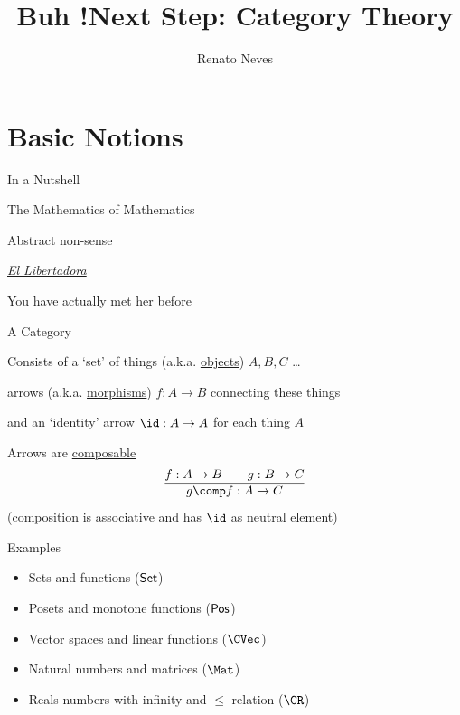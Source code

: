 \documentclass{beamer}
\author[Renato Neves]{Renato Neves}
\date{}
\begin{document}
\title{Buh !}
\frame[plain]{\titlepage}


\title{Next Step: Category Theory}

\frame[plain]{\titlepage}

\section{Basic Notions}

\begin{frame}{In a Nutshell}

        The Mathematics of Mathematics

        \bigskip
        \pause
        Abstract non-sense

        \bigskip
        \pause
        \alert{\underline{\emph{El Libertadora}}}

        \bigskip
        \pause
        You have actually met her before
\end{frame}

\begin{frame}{A Category}

        Consists of a `set' of things (a.k.a. \alert{\underline{objects}}) $A,B,C$ \dots

        \medskip
        arrows (a.k.a. \alert{\underline{morphisms}}) $f : A \to B$ connecting these things

        \medskip
        and an `identity' arrow $\id : A \to A$ for each thing $A$

        \vfill
        \pause
        Arrows are \alert{\underline{composable}} \ie\
        \[
                \infer{
                        g \comp f : A \to C
                }{
                        f : A \to B \qquad g : B \to C}
        \]
        \pause
        (composition is associative and has $\id$ as neutral element)
\end{frame}

\begin{frame}{Examples}
        \begin{itemize}
                \item Sets and functions ($\mathsf{Set}$) \\[10pt]
                \item Posets and monotone functions ($\mathsf{Pos}$) \\[10pt]
                \item Vector spaces and linear functions ($\CVec$) \\[10pt]
                \item Natural numbers and matrices ($\Mat$) \\[10pt]
                \item Reals numbers with infinity and $\leq$ relation ($\CR$)  \\[10pt]
        \end{itemize}
\end{frame}
\end{document}
